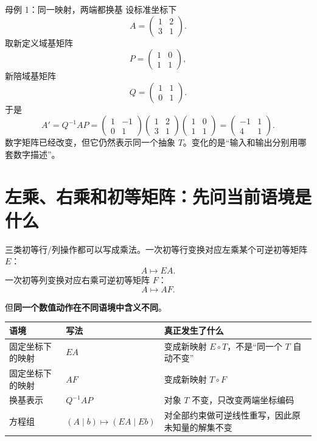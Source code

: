 \documentclass[11pt,a4paper]{ctexart}
\newcommand{\kw}[1]{\textbf{\color{deep}#1}}
\begin{document}
\begin{examplebox}{母例 1：同一映射，两端都换基}
设标准坐标下
\[
A=\begin{pmatrix}1&2\\3&1\end{pmatrix}.
\]
取新定义域基矩阵
\[
P=\begin{pmatrix}1&0\\1&1\end{pmatrix},
\]
新陪域基矩阵
\[
Q=\begin{pmatrix}1&1\\0&1\end{pmatrix}.
\]
于是
\[
A'=Q^{-1}AP
=\begin{pmatrix}1&-1\\0&1\end{pmatrix}
\begin{pmatrix}1&2\\3&1\end{pmatrix}
\begin{pmatrix}1&0\\1&1\end{pmatrix}
=\begin{pmatrix}-1&1\\4&1\end{pmatrix}.
\]
数字矩阵已经改变，但它仍然表示同一个抽象 $T$。变化的是“输入和输出分别用哪套数字描述”。
\end{examplebox}

\section{左乘、右乘和初等矩阵：先问当前语境是什么}

三类初等行/列操作都可以写成乘法。一次初等行变换对应左乘某个可逆初等矩阵 $E$：
\[
A\mapsto EA.
\]
一次初等列变换对应右乘可逆初等矩阵 $F$：
\[
A\mapsto AF.
\]

但\kw{同一个数值动作在不同语境中含义不同}。

\begin{longtable}{L{2.8cm}L{4.2cm}L{\dimexpr\linewidth-7.5cm\relax}}
\toprule
\textbf{语境} & \textbf{写法} & \textbf{真正发生了什么}\\
\midrule
固定坐标下的映射 & $EA$ & 变成新映射 $E\circ T$，不是“同一个 $T$ 自动不变”\\
固定坐标下的映射 & $AF$ & 变成新映射 $T\circ F$\\
换基表示 & $Q^{-1}AP$ & 对象 $T$ 不变，只改变两端坐标编码\\
方程组 & $(A\mid b)\mapsto(EA\mid Eb)$ & 对全部约束做可逆线性重写，因此原未知量的解集不变\\
\bottomrule
\end{longtable}
\end{document}
